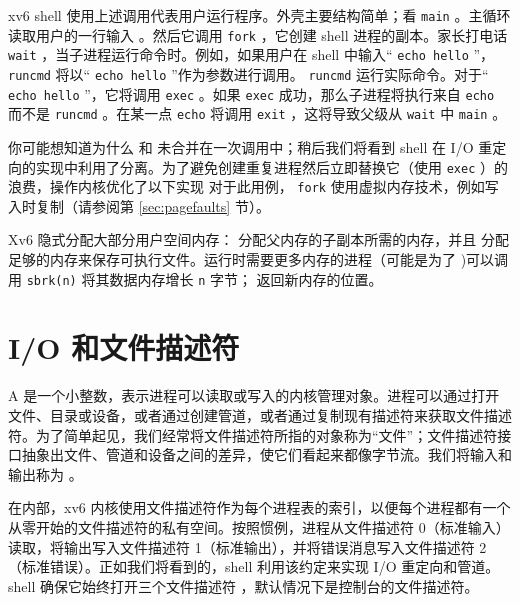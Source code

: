 \documentclass[UTF8]{article}
\begin{document}
xv6 shell 使用上述调用代表用户运行程序。外壳主要结构简单；看
    \lstinline{main}   
        。主循环读取用户的一行输入
        。然后它调用
    \lstinline{fork}    ，它创建 shell 进程的副本。家长打电话
    \lstinline{wait}   ，当子进程运行命令时。例如，如果用户在 shell 中输入“   \lstinline{echo hello}   ”，
    \lstinline{runcmd}    将以“   \lstinline{echo hello}   ”作为参数进行调用。
    \lstinline{runcmd}   
        运行实际命令。对于“   \lstinline{echo hello}   ”，它将调用
    \lstinline{exec}   
        。如果
    \lstinline{exec}    成功，那么子进程将执行来自
    \lstinline{echo}    而不是
    \lstinline{runcmd}    。在某一点
    \lstinline{echo}    将调用
    \lstinline{exit}    ，这将导致父级从
    \lstinline{wait}    中
    \lstinline{main}   
        。  

你可能想知道为什么
        和
        未合并在一次调用中；稍后我们将看到 shell 在 I/O 重定向的实现中利用了分离。为了避免创建重复进程然后立即替换它（使用    \lstinline{exec}    ）的浪费，操作内核优化了以下实现
 对于此用例，   \lstinline{fork}    使用虚拟内存技术，例如写入时复制（请参阅第    \ref{sec:pagefaults}    节）。  

Xv6 隐式分配大部分用户空间内存：
        分配父内存的子副本所需的内存，并且
        分配足够的内存来保存可执行文件。运行时需要更多内存的进程（可能是为了
        )可以调用
    \lstinline{sbrk(n)}    将其数据内存增长
    \lstinline{n}    字节；
        返回新内存的位置。
    \section{I/O 和文件描述符  }     

A
        是一个小整数，表示进程可以读取或写入的内核管理对象。进程可以通过打开文件、目录或设备，或者通过创建管道，或者通过复制现有描述符来获取文件描述符。为了简单起见，我们经常将文件描述符所指的对象称为“文件”；文件描述符接口抽象出文件、管道和设备之间的差异，使它们看起来都像字节流。我们将输入和输出称为        。  

在内部，xv6 内核使用文件描述符作为每个进程表的索引，以便每个进程都有一个从零开始的文件描述符的私有空间。按照惯例，进程从文件描述符 0（标准输入）读取，将输出写入文件描述符 1（标准输出），并将错误消息写入文件描述符 2（标准错误）。正如我们将看到的，shell 利用该约定来实现 I/O 重定向和管道。 shell 确保它始终打开三个文件描述符
        ，默认情况下是控制台的文件描述符。  
\end{document}
